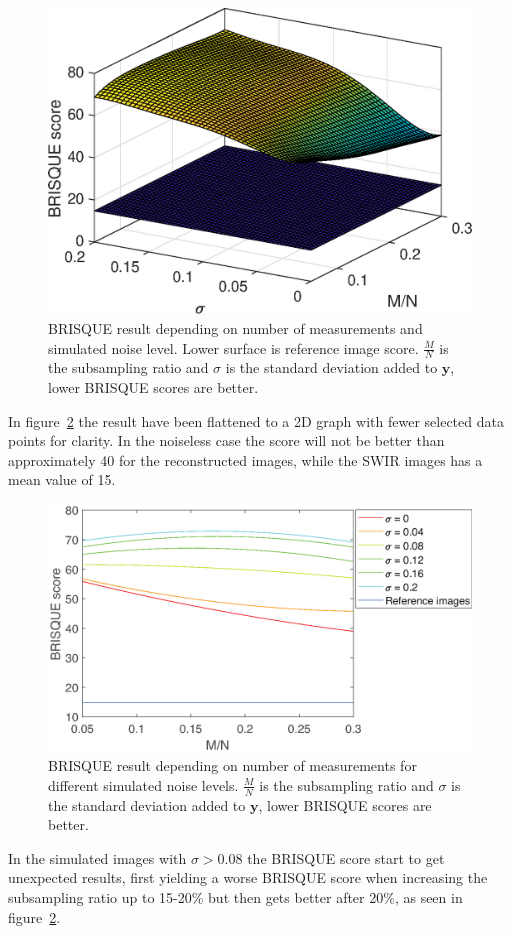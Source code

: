 \begin{figure}[H]
    \centering
    \includegraphics[width = 0.7\linewidth]{result/synt_brisque/BRISQUE_fit.eps}
    \caption{BRISQUE result depending on number of measurements and simulated noise level. Lower surface is reference image score. $\frac{M}{N}$ is the subsampling ratio and $\sigma$ is the standard deviation added to $\mathbf{y}$, lower BRISQUE scores are better.}
    \label{fig:Brisque_3d}
\end{figure}

In figure~\ref{fig:Brisque_2d} the result have been flattened to a 2D graph with fewer selected data points for clarity. In the noiseless case the score will not be better than approximately 40 for the reconstructed images, while the SWIR images has a mean value of 15.


\begin{figure}[H]
    \centering
    \includegraphics[width = 0.95\linewidth]{result/synt_brisque/Brisque_fit_flat3.eps}
    \caption{BRISQUE result depending on number of measurements for different simulated noise levels. $\frac{M}{N}$ is the subsampling ratio and $\sigma$ is the standard deviation added to $\mathbf{y}$, lower BRISQUE scores are better.}
    \label{fig:Brisque_2d}
\end{figure}

In the simulated images with $\sigma > 0.08$ the BRISQUE score start to get unexpected results, first yielding a worse BRISQUE score when increasing the subsampling ratio up to 15-20\%  but then gets better after 20\%, as seen in figure~\ref{fig:Brisque_2d}.
